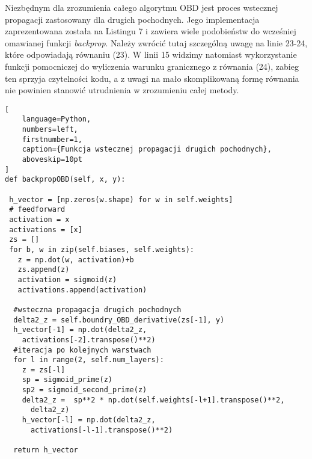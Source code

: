\par Niezbędnym dla zrozumienia całego algorytmu OBD jest proces wstecznej propagacji zastosowany dla drugich pochodnych. Jego implementacja zaprezentowana została na Listingu 7 i zawiera wiele podobieństw do wcześniej omawianej funkcji \emph{backprop}. Należy zwrócić tutaj szczególną uwagę na linie 23-24, które odpowiadają równaniu (23). W linii 15 widzimy natomiast wykorzystanie funkcji pomocniczej do wyliczenia warunku granicznego z równania (24), zabieg ten sprzyja czytelności kodu, a z uwagi na mało skomplikowaną formę równania nie powinien stanowić utrudnienia w zrozumieniu całej metody.
\begin{addmargin}[10mm]{0mm}
\begin{lstlisting}[
    language=Python,
    numbers=left,
    firstnumber=1,
    caption={Funkcja wstecznej propagacji drugich pochodnych},
    aboveskip=10pt
]
def backpropOBD(self, x, y):
        
 h_vector = [np.zeros(w.shape) for w in self.weights]
 # feedforward
 activation = x
 activations = [x] 
 zs = []
 for b, w in zip(self.biases, self.weights):
   z = np.dot(w, activation)+b
   zs.append(z)
   activation = sigmoid(z)
   activations.append(activation)

  #wsteczna propagacja drugich pochodnych
  delta2_z = self.boundry_OBD_derivative(zs[-1], y)
  h_vector[-1] = np.dot(delta2_z,
    activations[-2].transpose()**2)
  #iteracja po kolejnych warstwach
  for l in range(2, self.num_layers):
    z = zs[-l]
    sp = sigmoid_prime(z)
    sp2 = sigmoid_second_prime(z)    
    delta2_z =  sp**2 * np.dot(self.weights[-l+1].transpose()**2,
      delta2_z)             
    h_vector[-l] = np.dot(delta2_z,
      activations[-l-1].transpose()**2)
           
  return h_vector
\end{lstlisting}
\end{addmargin}

